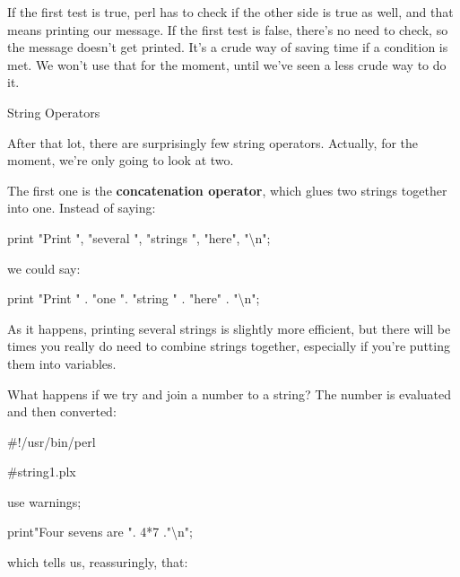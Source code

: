 \documentclass[a4paper,11pt]{book}
\begin{document}
\noindent 

\noindent If the first test is true, perl has to check if the other side is true as well, and that means printing our message. If the first test is false, there's no need to check, so the message doesn't get printed. It's a crude way of saving time if a condition is met. We won't use that for the moment, until we've seen a less crude way to do it.

\noindent 

\noindent String Operators

\noindent 

\noindent After that lot, there are surprisingly few string operators. Actually, for the moment, we're only going to look at two.

\noindent 

\noindent The first one is the \textbf{concatenation operator}, which glues two strings together into one. Instead of saying:

\noindent 

\noindent 

\noindent print "Print ", "several ", "strings ", "here", "\textbackslash n";

\noindent 

\noindent we could say:

\noindent 

\noindent 

\noindent print "Print " . "one ". "string " . "here" . "\textbackslash n";

\noindent 

\noindent As it happens, printing several strings is slightly more efficient, but there will be times you really do need to combine strings together, especially if you're putting them into variables.

\noindent 

\noindent What happens if we try and join a number to a string? The number is evaluated and then converted:

\noindent 

\noindent 

\noindent \#!/usr/bin/perl

\noindent \#string1.plx

\noindent use warnings;

\noindent print"Four sevens are ". 4*7 ."\textbackslash n";

\noindent 

\noindent which tells us, reassuringly, that:
\end{document}

